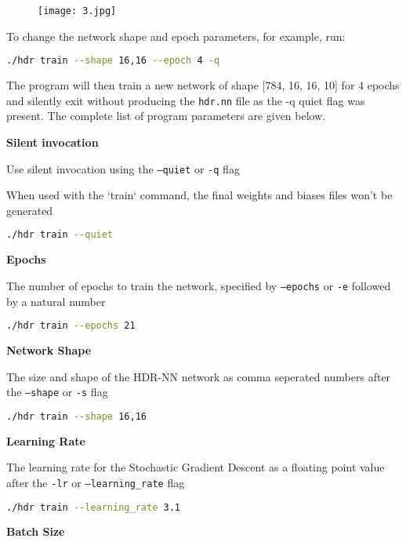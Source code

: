 \begin{figure}[h]
	\centering
	\texttt{[image: 3.jpg]}
\end{figure}

To change the network shape and epoch parameters, for example, run:

\begin{lstlisting}[language=Bash]
	./hdr train --shape 16,16 --epoch 4 -q
\end{lstlisting}

The program will then train a new network of shape [784, 16, 16, 10] for 4 epochs and silently exit without producing the \texttt{hdr.nn} file as the -q quiet flag was present. The complete list of program parameters are given below.

\textbf{Silent invocation}

Use silent invocation using the \texttt{--quiet} or \texttt{-q} flag

When used with the `train` command, the final weights and biases files won't be generated

\begin{lstlisting}[language=Bash]
	./hdr train --quiet
\end{lstlisting}

\textbf{Epochs}

The number of epochs to train the network, specified by \texttt{--epochs} or \texttt{-e} followed by a natural number

\begin{lstlisting}[language=Bash]
	./hdr train --epochs 21
\end{lstlisting}

\textbf{Network Shape}

The size and shape of the HDR-NN network as comma seperated numbers after the \texttt{--shape} or \texttt{-s} flag

\begin{lstlisting}[language=Bash]
	./hdr train --shape 16,16
\end{lstlisting}

\textbf{Learning Rate}

The learning rate for the Stochastic Gradient Descent as a floating point value after the \texttt{-lr} or \texttt{--learning\_rate} flag

\begin{lstlisting}[language=Bash]
	./hdr train --learning_rate 3.1
\end{lstlisting}

\textbf{Batch Size}

